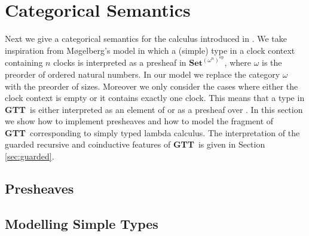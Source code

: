 \documentclass[a4paper,UKenglish,cleveref, autoref,numberwithinsect]{lipics-v2019}
\newcommand{\AD}[1]{\AgdaDatatype{#1}}
\newcommand{\F}{\AgdaFunction}
\newcommand{\GTT}{\textbf{GTT}}
\newcommand{\Set}{\mathbf{Set}}
\begin{document}
\section{Categorical Semantics}

Next we give a categorical semantics for the calculus introduced in
.  We take inspiration from M{\o}gelberg's model
\cite{Mogelberg14} in which a (simple) type in a clock context
containing $n$ clocks is interpreted
as a presheaf in $\Set^{(\omega^n)^{\text{op}}}$, where $\omega$ is
the preorder of ordered natural numbers. In our model we replace the
category $\omega$ with the preorder of sizes. Moreover we only
consider the cases where either the clock context is empty or it
contains exactly one clock. This means that a type in \GTT\ is either
interpreted as an element of \F{Set} or as a presheaf over \F{Size}. 
In this section we show how to implement presheaves and how to model
the fragment of \GTT\ corresponding to simply typed lambda
calculus. The interpretation of the guarded recursive and coinductive
features of \GTT\ is given in Section \ref{sec:guarded}.

\label{sec:presheaf_sem}
\subsection{Presheaves}
\label{sec:presheaves}







\subsection{Modelling Simple Types}





\end{document}
